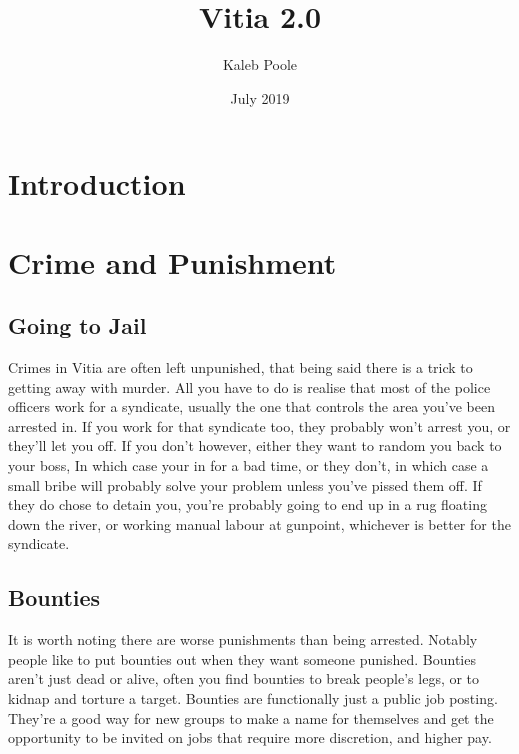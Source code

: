 \documentclass{article}
\title{Vitia 2.0}
\author{Kaleb Poole}
\date{July 2019}
\begin{document}
\begin{multicols}{2}
\tableofcontents
\end{multicols}
\newpage
\section{Introduction}
\section{Crime and Punishment}
\begin{multicols}{2}
\subsection{Going to Jail}
Crimes in Vitia are often left unpunished, that being said there is a trick to getting away with murder. All you have to do is realise that most of the police officers work for a syndicate, usually the one that controls the area you've been arrested in. If you work for that syndicate too, they probably won't arrest you, or they'll let you off. If you don't however, either they want to random you back to your boss, In which case your in for a bad time, or they don't, in which case a small bribe will probably solve your problem unless you've pissed them off. If they do chose to detain you, you're probably going to end up in a rug floating down the river, or working manual labour at gunpoint, whichever is better for the syndicate.\par
\columnbreak
\subsection{Bounties}
It is worth noting there are worse punishments than being arrested. Notably people like to put bounties out when they want someone punished. Bounties aren't just dead or alive, often you find bounties to break people's legs, or to kidnap and torture a target. Bounties are functionally just a public job posting. They're a good way for new groups to make a name for themselves and get the opportunity to be invited on jobs that require more discretion, and higher pay.
\end{multicols}
\end{document}
